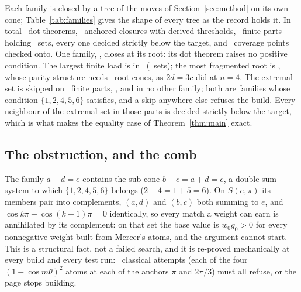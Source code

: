 \documentclass[11pt]{article}
\begin{document}
Each family is closed by a tree of the moves of Section~\ref{sec:method} on its own cone; Table~\ref{tab:families} gives the shape of every tree as the record holds it. In total \FamDots\ dot theorems, \FamClosures\ anchored closures with derived thresholds, \FamParts\ finite parts holding \FamSets\ sets, every one decided strictly below the target, and \FamOnto\ coverage points checked onto. One family, \FamDirectList, closes at its root: its dot theorem raises no positive condition. The largest finite load is in \FamMaxSetsName\ (\FamMaxSets\ sets); the most fragmented root is \FamMaxConesName, whose parity structure needs \FamMaxCones\ root cones, as $2d=3c$ did at $n=4$. The extremal set is skipped on \FamWallsWord\ finite parts, \FamWallList, and in no other family; both are families whose condition $\{1,2,4,5,6\}$ satisfies, and a skip anywhere else refuses the build. Every neighbour of the extremal set in those parts is decided strictly below the target, which is what makes the equality case of Theorem~\ref{thm:main} exact.

\begin{table}[t]\centering\small
{}
\caption{The eight families of Table~\ref{tab:generic}, each CLOSED in the campaign record (\CampaignDate, git \CampaignGit). Depth is the deepest node of the closure tree; skips are the finite parts on which $\{1,2,4,5,6\}$ is set aside as the definitional witness.}\label{tab:families}
\end{table}

\subsection{The obstruction, and the comb}\label{sec:comb}

The family $a+d=e$ contains the sub-cone $b+c=a+d=e$, a double-sum system to which $\{1,2,4,5,6\}$ belongs ($2+4=1+5=6$). On $S(e,\pi)$ its members pair into complements, $(a,d)$ and $(b,c)$ both summing to $e$, and $\cos k\pi+\cos(k-1)\pi=0$ identically, so every match a weight can earn is annihilated by its complement: on that set the base value is $w_0g_0>0$ for every nonnegative weight built from Mercer's atoms, and the argument cannot start. This is a structural fact, not a failed search, and it is re-proved mechanically at every build and every test run: \CoreRefusals\ classical attempts (each of the four $(1-\cos m\theta)^2$ atoms at each of the anchors $\pi$ and $2\pi/3$) must all refuse, or the page stops building.
\end{document}
